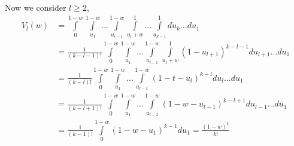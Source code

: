 \documentclass{llncs}
\begin{document}
Now we consider $l\ge 2$,
\begin{align}
V_{l}(w) & = \displaystyle \int\limits_0^{1-w}\int\limits_{{u_1}}^{1-w}...\int\limits_{u_{l-1}}^{1-w}\int\limits_{u_l+w}^1...\int\limits_{u_{k-1}}^1 du_k... du_1  \nonumber \\ 
& =  \displaystyle \frac{1}{(k-l-1)!}\displaystyle \int\limits_0^{1-w}\int\limits_{{u_1}}^{1-w}...\int\limits_{u_{l-1}}^{1-w}\int\limits_{u_l+w}^1 \left( 1-u_{l+1} \right)^{k-l-1} du_{l+1}...du_1   \nonumber \\
&=  \displaystyle \frac{1}{(k-l)!}\displaystyle \int\limits_0^{1-w}\int\limits_{{u_1}}^{1-w}...\int\limits_{u_{l-1}}^{1-w} \left( 1-t-u_{l} \right)^{k-l} du_l...du_1   \nonumber \\
& = \displaystyle \frac{1}{(k-l+1)!}\displaystyle \int\limits_0^{1-w}\int\limits_{{u_1}}^{1-w}...\int\limits_{u_{l-2}}^{1-w} \left( 1-w-u_{l-1} \right)^{k-l+1} du_{l-1}...du_1   \nonumber \\
& =  \displaystyle \frac{1}{(k-1)!} \int\limits_0^{1-w}\left( 1-w-u_1 \right)^{k-1} du_1 = \frac{(1-w)^k}{k!} \label{eq:p_k}
\end{align}


\end{document}
